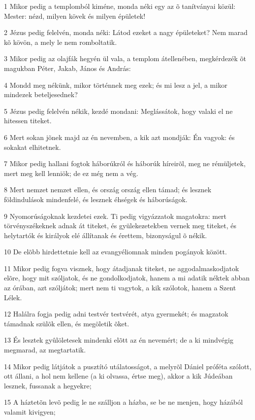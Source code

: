 \par 1 Mikor pedig a templomból kiméne, monda néki egy az õ tanítványai közül: Mester: nézd, milyen kövek és milyen épületek!
\par 2 Jézus pedig felelvén, monda néki: Látod ezeket a nagy épületeket? Nem marad kõ kövön, a mely le nem romboltatik.
\par 3 Mikor pedig az olajfák hegyén ül vala, a templom átellenében, megkérdezék õt magukban Péter, Jakab, János és András:
\par 4 Mondd meg nékünk, mikor történnek meg ezek; és mi lesz a jel, a mikor mindezek beteljesednek?
\par 5 Jézus pedig felelvén nékik, kezdé mondani: Meglássátok, hogy valaki el ne hitessen titeket.
\par 6 Mert sokan jõnek majd az én nevemben, a kik azt mondják: Én vagyok: és sokakat elhitetnek.
\par 7 Mikor pedig hallani fogtok háborúkról és háborúk híreirõl, meg ne rémüljetek, mert meg kell lenniök; de ez még nem a vég.
\par 8 Mert nemzet nemzet ellen, és ország ország ellen támad; és lesznek földindulások mindenfelé, és lesznek éhségek és háborúságok.
\par 9 Nyomorúságoknak kezdetei ezek. Ti pedig vigyázzatok magatokra: mert törvényszékeknek adnak át titeket, és gyülekezetekben vernek meg titeket, és helytartók és királyok elé állítanak és érettem, bizonyságul õ nékik.
\par 10 De elõbb hirdettetnie kell az evangyéliomnak minden pogányok között.
\par 11 Mikor pedig fogva visznek, hogy átadjanak titeket, ne aggodalmaskodjatok elõre, hogy mit szóljatok, és ne gondolkodjatok, hanem a mi adatik néktek abban az órában, azt szóljátok; mert nem ti vagytok, a kik szólotok, hanem a Szent Lélek.
\par 12 Halálra fogja pedig adni testvér testvérét, atya gyermekét; és magzatok támadnak szülõk ellen, és megöletik õket.
\par 13 És lesztek gyûlöletesek mindenki elõtt az én nevemért; de a ki mindvégig megmarad, az megtartatik.
\par 14 Mikor pedig látjátok a pusztító utálatosságot, a melyrõl Dániel próféta szólott, ott állani, a hol nem kellene (a ki  olvassa, értse meg), akkor a kik Júdeában lesznek, fussanak a hegyekre;
\par 15 A háztetõn levõ pedig le ne szálljon a házba, se be ne menjen, hogy házából valamit kivigyen;

